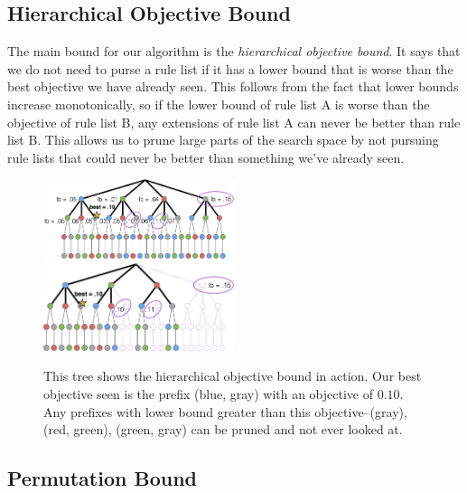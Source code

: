 \subsection{Hierarchical Objective Bound}
The main bound for our algorithm is the \textit{hierarchical objective bound}. 
It says that we do not need to purse a rule list if it has a lower bound that is worse than the best objective we have already seen.
This follows from the fact that lower bounds increase monotonically, so if the lower bound of rule list A is worse than the objective of rule list B, any extensions of rule list A can never be better than rule list B.
This allows us to prune large parts of the search space by not pursuing rule lists that could never be better than something we've already seen.

\begin{figure}
\includegraphics[width=0.5\textwidth]{figs/ela_branch-and-bound-tree.png}
\includegraphics[width=0.5\textwidth]{figs/ela_branch-and-bound-tree-pruned.png}
\caption[Objective bound]{This tree shows the hierarchical objective bound in action. Our best objective seen is the prefix (blue, gray) with an objective of $0.10$. Any prefixes with lower bound greater than this objective--(gray), (red, green), (green, gray) can be pruned and not ever looked at.
\label{fig:objective-bound}}
\end{figure}

\subsection{Permutation Bound}

